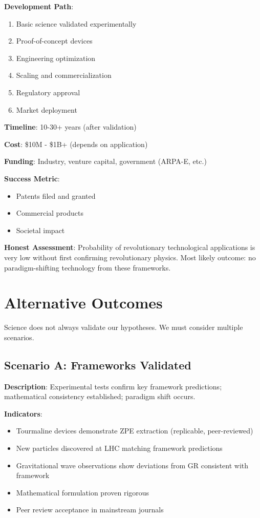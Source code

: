 \textbf{Development Path}:
\begin{enumerate}
    \item Basic science validated experimentally
    \item Proof-of-concept devices
    \item Engineering optimization
    \item Scaling and commercialization
    \item Regulatory approval
    \item Market deployment
\end{enumerate}

\textbf{Timeline}: 10-30+ years (after validation)

\textbf{Cost}: \$10M - \$1B+ (depends on application)

\textbf{Funding}: Industry, venture capital, government (ARPA-E, etc.)

\textbf{Success Metric}:
\begin{itemize}
    \item Patents filed and granted
    \item Commercial products
    \item Societal impact
\end{itemize}

\textbf{Honest Assessment}: Probability of revolutionary technological applications is very low without first confirming revolutionary physics. Most likely outcome: no paradigm-shifting technology from these frameworks.

\section{Alternative Outcomes}

Science does not always validate our hypotheses. We must consider multiple scenarios.

\subsection{Scenario A: Frameworks Validated}

\textbf{Description}: Experimental tests confirm key framework predictions; mathematical consistency established; paradigm shift occurs.

\textbf{Indicators}:
\begin{itemize}
    \item Tourmaline devices demonstrate ZPE extraction (replicable, peer-reviewed)
    \item New particles discovered at LHC matching framework predictions
    \item Gravitational wave observations show deviations from GR consistent with framework
    \item Mathematical formulation proven rigorous
    \item Peer review acceptance in mainstream journals
\end{itemize}

